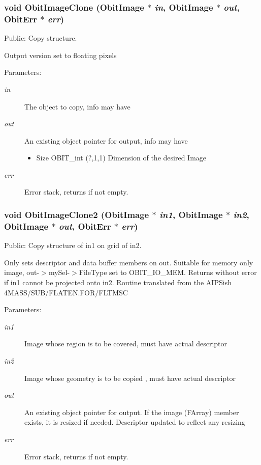\subsubsection{\setlength{\rightskip}{0pt plus 5cm}void Obit\-Image\-Clone ({\bf Obit\-Image} $\ast$ {\em in}, {\bf Obit\-Image} $\ast$ {\em out}, {\bf Obit\-Err} $\ast$ {\em err})}\label{ObitImage_8c_a17}


Public: Copy structure. 

Output version set to floating pixels \begin{Desc}
\item[Parameters:]
\begin{description}
\item[{\em in}]The object to copy, info may have \item[{\em out}]An existing object pointer for output, info may have \begin{itemize}
\item Size OBIT\_\-int (?,1,1) Dimension of the desired Image \end{itemize}
\item[{\em err}]Error stack, returns if not empty. \end{description}
\end{Desc}
\subsubsection{\setlength{\rightskip}{0pt plus 5cm}void Obit\-Image\-Clone2 ({\bf Obit\-Image} $\ast$ {\em in1}, {\bf Obit\-Image} $\ast$ {\em in2}, {\bf Obit\-Image} $\ast$ {\em out}, {\bf Obit\-Err} $\ast$ {\em err})}\label{ObitImage_8c_a18}


Public: Copy structure of in1 on grid of in2. 

Only sets descriptor and data buffer members on out. Suitable for memory only image, out-$>$my\-Sel-$>$File\-Type set to OBIT\_\-IO\_\-MEM. Returns without error if in1 cannot be projected onto in2. Routine translated from the AIPSish 4MASS/SUB/FLATEN.FOR/FLTMSC \begin{Desc}
\item[Parameters:]
\begin{description}
\item[{\em in1}]Image whose region is to be covered, must have actual descriptor \item[{\em in2}]Image whose geometry is to be copied , must have actual descriptor \item[{\em out}]An existing object pointer for output. If the image (FArray) member exists, it is resized if needed. Descriptor updated to reflect any resizing \item[{\em err}]Error stack, returns if not empty. \end{description}
\end{Desc}
